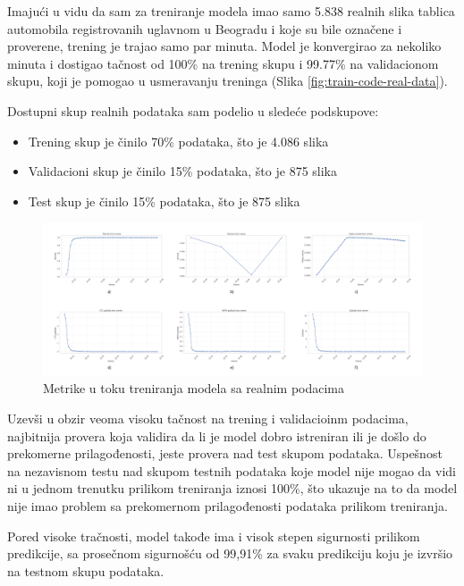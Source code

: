 \documentclass[a4paper,12pt]{article}
\begin{document}
	Imajući u vidu da sam za treniranje modela imao samo 5.838 realnih slika tablica automobila registrovanih uglavnom u Beogradu i koje su bile označene i proverene, trening je trajao samo par minuta. Model je konvergirao za nekoliko minuta i dostigao tačnost od 100\% na trening skupu i 99.77\% na validacionom skupu, koji je pomogao u usmeravanju treninga (Slika \ref{fig:train-code-real-data}).\newline
	
	Dostupni skup realnih podataka sam podelio u sledeće podskupove:
	\begin{itemize}
		\item Trening skup je činilo 70\% podataka, što je 4.086 slika
		\item Validacioni skup je činilo 15\% podataka, što je 875 slika
		\item Test skup je činilo 15\% podataka, što je 875 slika
	\end{itemize}

	\begin{figure}[H]
		\centering
		\includegraphics[width=\textwidth]{assets/real-data-metrics.png}
		\caption{Metrike u toku treniranja modela sa realnim podacima}
		\label{fig:real-data-metrics}
	\end{figure}
	
	Uzevši u obzir veoma visoku tačnost na trening i validacioinm podacima, najbitnija provera koja validira da li je model dobro istreniran ili je došlo do prekomerne prilagođenosti, jeste provera nad test skupom podataka. Uspešnost na nezavisnom testu nad skupom testnih podataka koje model nije mogao da vidi ni u jednom trenutku prilikom treniranja iznosi 100\%, što ukazuje na to da model nije imao problem sa prekomernom prilagođenosti podataka prilikom treniranja.
	
	Pored visoke tračnosti, model takođe ima i visok stepen sigurnosti prilikom predikcije, sa prosečnom sigurnošću od 99,91\% za svaku predikciju koju je izvršio na testnom skupu podataka.
	
\end{document}

